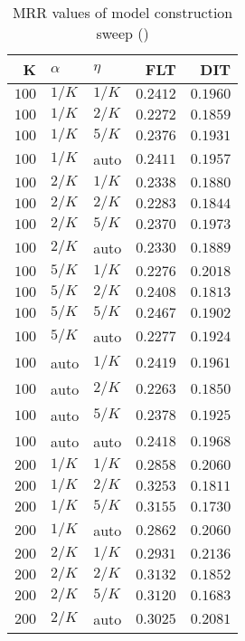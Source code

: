 
\begin{table}
\begin{spacing}{1.2}
\centering
\caption{MRR values of \pig model construction sweep (\cone)}
\label{table:pig_model_sweep}
\vspace{0.2em}
\parbox{.45\linewidth}{\centering \begin{tabular}{rll|rr}
\toprule
    K &  $\alpha$ &    $\eta$ &      FLT &      DIT \\
\midrule
$100$ &  $1/K$ &  $1/K$ & $0.2412$ & $0.1960$ \\
$100$ &  $1/K$ &  $2/K$ & $0.2272$ & $0.1859$ \\
$100$ &  $1/K$ &  $5/K$ & $0.2376$ & $0.1931$ \\
$100$ &  $1/K$ &   auto & $0.2411$ & $0.1957$ \\
$100$ &  $2/K$ &  $1/K$ & $0.2338$ & $0.1880$ \\
$100$ &  $2/K$ &  $2/K$ & $0.2283$ & $0.1844$ \\
$100$ &  $2/K$ &  $5/K$ & $0.2370$ & $0.1973$ \\
$100$ &  $2/K$ &   auto & $0.2330$ & $0.1889$ \\
$100$ &  $5/K$ &  $1/K$ & $0.2276$ & $0.2018$ \\
$100$ &  $5/K$ &  $2/K$ & $0.2408$ & $0.1813$ \\
$100$ &  $5/K$ &  $5/K$ & $0.2467$ & $0.1902$ \\
$100$ &  $5/K$ &   auto & $0.2277$ & $0.1924$ \\
$100$ &   auto &  $1/K$ & $0.2419$ & $0.1961$ \\
$100$ &   auto &  $2/K$ & $0.2263$ & $0.1850$ \\
$100$ &   auto &  $5/K$ & $0.2378$ & $0.1925$ \\
$100$ &   auto &   auto & $0.2418$ & $0.1968$ \\
$200$ &  $1/K$ &  $1/K$ & $0.2858$ & $0.2060$ \\
$200$ &  $1/K$ &  $2/K$ & $0.3253$ & $0.1811$ \\
$200$ &  $1/K$ &  $5/K$ & $0.3155$ & $0.1730$ \\
$200$ &  $1/K$ &   auto & $0.2862$ & $0.2060$ \\
$200$ &  $2/K$ &  $1/K$ & $0.2931$ & $0.2136$ \\
$200$ &  $2/K$ &  $2/K$ & $0.3132$ & $0.1852$ \\
$200$ &  $2/K$ &  $5/K$ & $0.3120$ & $0.1683$ \\
$200$ &  $2/K$ &   auto & $0.3025$ & $0.2081$ \\

\end{tabular}}
\end{spacing}
\end{table}

